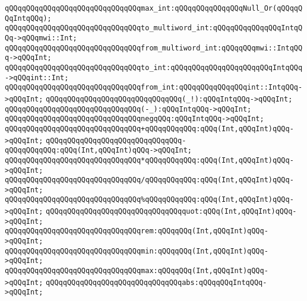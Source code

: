 \verb|qQQqqQQqqQQqqQQqqQQqqQQqqQQqqQQqmax_int:qQQqqQQqqQQqqQQqNull_Or(qQQqqQQqIntqQQq);|\newline
\newline
\verb|qQQqqQQqqQQqqQQqqQQqqQQqqQQqqQQqto_multiword_int:qQQqqQQqqQQqqQQqIntqQQq->qQQqmwi::Int;|\newline
\verb|qQQqqQQqqQQqqQQqqQQqqQQqqQQqqQQqfrom_multiword_int:qQQqqQQqmwi::IntqQQq->qQQqInt;|\newline
\newline
\verb|qQQqqQQqqQQqqQQqqQQqqQQqqQQqqQQqto_int:qQQqqQQqqQQqqQQqqQQqqQQqIntqQQq->qQQqint::Int;|\newline
\verb|qQQqqQQqqQQqqQQqqQQqqQQqqQQqqQQqfrom_int:qQQqqQQqqQQqqQQqint::IntqQQq->qQQqInt;|\newline
\newline
\verb|qQQqqQQqqQQqqQQqqQQqqQQqqQQqqQQq(_!):qQQqIntqQQq->qQQqInt;|\newline
\verb|qQQqqQQqqQQqqQQqqQQqqQQqqQQqqQQq(-_):qQQqIntqQQq->qQQqInt;|\newline
\verb|qQQqqQQqqQQqqQQqqQQqqQQqqQQqqQQqnegqQQq:qQQqIntqQQq->qQQqInt;|\newline
\verb|qQQqqQQqqQQqqQQqqQQqqQQqqQQqqQQq+qQQqqQQqqQQq:qQQq(Int,qQQqInt)qQQq->qQQqInt;|\newline
\verb|qQQqqQQqqQQqqQQqqQQqqQQqqQQqqQQq-qQQqqQQqqQQq:qQQq(Int,qQQqInt)qQQq->qQQqInt;|\newline
\verb|qQQqqQQqqQQqqQQqqQQqqQQqqQQqqQQq*qQQqqQQqqQQq:qQQq(Int,qQQqInt)qQQq->qQQqInt;|\newline
\verb|qQQqqQQqqQQqqQQqqQQqqQQqqQQqqQQq/qQQqqQQqqQQq:qQQq(Int,qQQqInt)qQQq->qQQqInt;|\newline
\verb|qQQqqQQqqQQqqQQqqQQqqQQqqQQqqQQq%qQQqqQQqqQQq:qQQq(Int,qQQqInt)qQQq->qQQqInt;|\newline
\verb|qQQqqQQqqQQqqQQqqQQqqQQqqQQqqQQqquot:qQQq(Int,qQQqInt)qQQq->qQQqInt;|\newline
\verb|qQQqqQQqqQQqqQQqqQQqqQQqqQQqqQQqrem:qQQqqQQq(Int,qQQqInt)qQQq->qQQqInt;|\newline
\newline
\verb|qQQqqQQqqQQqqQQqqQQqqQQqqQQqqQQqmin:qQQqqQQq(Int,qQQqInt)qQQq->qQQqInt;|\newline
\verb|qQQqqQQqqQQqqQQqqQQqqQQqqQQqqQQqmax:qQQqqQQq(Int,qQQqInt)qQQq->qQQqInt;|\newline
\newline
\verb|qQQqqQQqqQQqqQQqqQQqqQQqqQQqqQQqabs:qQQqqQQqIntqQQq->qQQqInt;|\newline
\newline
